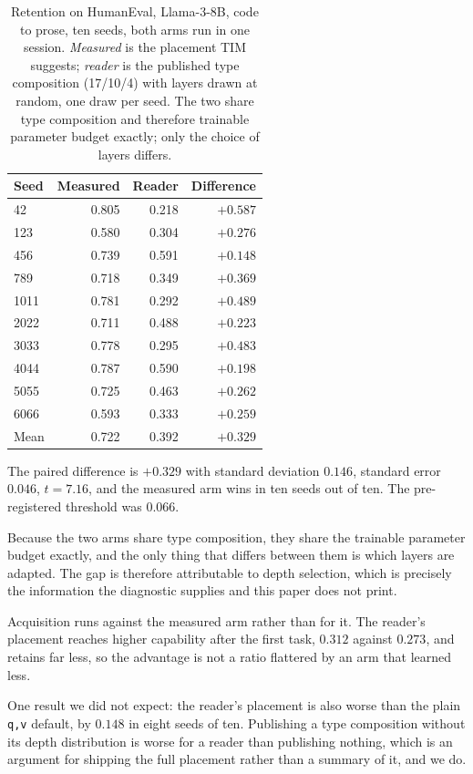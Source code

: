 \documentclass[11pt]{article}
\begin{document}
\begin{table}[h]
\centering
\caption{Retention on HumanEval, Llama-3-8B, code to prose, ten seeds, both arms
run in one session. \emph{Measured} is the placement TIM suggests; \emph{reader}
is the published type composition (17/10/4) with layers drawn at random, one
draw per seed. The two share type composition and therefore trainable parameter
budget exactly; only the choice of layers differs.}
\label{tab:reader}
\begin{tabular}{lrrr}
\hline
Seed & Measured & Reader & Difference \\
\hline
42   & 0.805 & 0.218 & $+0.587$ \\
123  & 0.580 & 0.304 & $+0.276$ \\
456  & 0.739 & 0.591 & $+0.148$ \\
789  & 0.718 & 0.349 & $+0.369$ \\
1011 & 0.781 & 0.292 & $+0.489$ \\
2022 & 0.711 & 0.488 & $+0.223$ \\
3033 & 0.778 & 0.295 & $+0.483$ \\
4044 & 0.787 & 0.590 & $+0.198$ \\
5055 & 0.725 & 0.463 & $+0.262$ \\
6066 & 0.593 & 0.333 & $+0.259$ \\
\hline
Mean & 0.722 & 0.392 & $\mathbf{+0.329}$ \\
\hline
\end{tabular}
\end{table}

The paired difference is $+0.329$ with standard deviation $0.146$, standard
error $0.046$, $t = 7.16$, and the measured arm wins in ten seeds out of ten.
The pre-registered threshold was $0.066$.

Because the two arms share type composition, they share the trainable parameter
budget exactly, and the only thing that differs between them is which layers are
adapted. The gap is therefore attributable to depth selection, which is
precisely the information the diagnostic supplies and this paper does not print.

Acquisition runs against the measured arm rather than for it. The reader's
placement reaches higher capability after the first task, $0.312$ against
$0.273$, and retains far less, so the advantage is not a ratio flattered by an
arm that learned less.

One result we did not expect: the reader's placement is also worse than the
plain \texttt{q,v} default, by $0.148$ in eight seeds of ten. Publishing a type
composition without its depth distribution is worse for a reader than publishing
nothing, which is an argument for shipping the full placement rather than a
summary of it, and we do.
\end{document}
